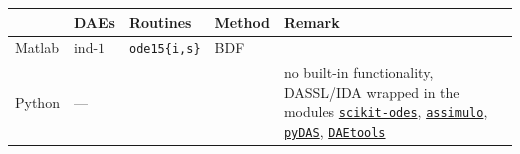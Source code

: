 \documentclass[]{book}
\theoremstyle{definition}
\theoremstyle{definition}
\theoremstyle{definition}
\theoremstyle{remark}
\begin{document}
\begin{longtable}[]{@{}lllll@{}}
\toprule
\begin{minipage}[b]{0.05\columnwidth}\raggedright
\strut
\end{minipage} & \begin{minipage}[b]{0.05\columnwidth}\raggedright
DAEs\strut
\end{minipage} & \begin{minipage}[b]{0.30\columnwidth}\raggedright
Routines\strut
\end{minipage} & \begin{minipage}[b]{0.05\columnwidth}\raggedright
Method\strut
\end{minipage} & \begin{minipage}[b]{0.40\columnwidth}\raggedright
Remark\strut
\end{minipage}\tabularnewline
\midrule
\endhead
\begin{minipage}[t]{0.05\columnwidth}\raggedright
Matlab\strut
\end{minipage} & \begin{minipage}[t]{0.05\columnwidth}\raggedright
ind-\(1\)\strut
\end{minipage} & \begin{minipage}[t]{0.30\columnwidth}\raggedright
\texttt{ode15\{i,s\}}\strut
\end{minipage} & \begin{minipage}[t]{0.05\columnwidth}\raggedright
BDF\strut
\end{minipage} & \begin{minipage}[t]{0.40\columnwidth}\raggedright
\strut
\end{minipage}\tabularnewline
\begin{minipage}[t]{0.05\columnwidth}\raggedright
Python\strut
\end{minipage} & \begin{minipage}[t]{0.05\columnwidth}\raggedright
---\strut
\end{minipage} & \begin{minipage}[t]{0.30\columnwidth}\raggedright
\strut
\end{minipage} & \begin{minipage}[t]{0.05\columnwidth}\raggedright
\strut
\end{minipage} & \begin{minipage}[t]{0.40\columnwidth}\raggedright
no built-in functionality, DASSL/IDA wrapped in the modules \href{https://github.com/bmcage/odes/tree/master}{\texttt{scikit-odes}}, \href{https://jmodelica.org/assimulo/index.html\#}{\texttt{assimulo}}, \href{https://github.com/jwallen/PyDAS}{\texttt{pyDAS}}, \href{http://daetools.com/docs/index.html}{\texttt{DAEtools}}\strut

\end{minipage}
\end{longtable}
\end{document}
